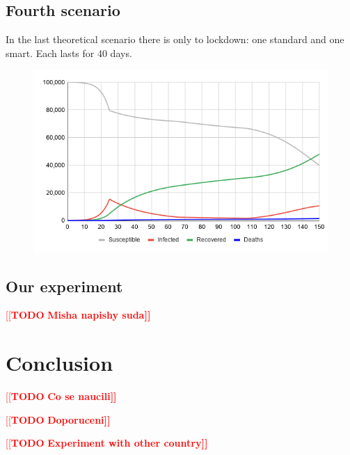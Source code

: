 \documentclass[12pt,a4paper,english]{article}
\newcommand{\todo}[1]{\textcolor{red}{[[\textbf{TODO} \textbf{#1]]}}}
\begin{document}
    \subsection{Fourth scenario}
    In the last theoretical scenario there is only to lockdown: one standard and one smart.
    Each lasts for 40 days.
    \begin{figure}[h!]
        \centering
        \includegraphics[scale=0.55]{med+smart.png}
    \end{figure}

    \subsection{Our experiment}
    \todo{Misha napishy suda}

    \section{Conclusion}
    \todo{Co se naucili}
    
    \todo{Doporuceni}

    \todo{Experiment with other country}

    \clearpage
	
	
\end{document}
